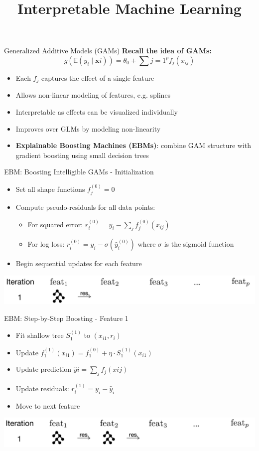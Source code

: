 \documentclass[11pt,compress,t,notes=noshow,aspectratio=169,xcolor=table]{beamer}
\title{Interpretable Machine Learning} \date{}
\begin{document}
\begin{frame}{Generalized Additive Models (GAMs)} \textbf{Recall the idea of GAMs:} \begin{equation*} g(\mathbb{E}(y_i \mid \mathbf{x}i)) = \theta_0 + \sum{j=1}^p f_j(x_{ij}) \end{equation*} \begin{itemize} \item Each $f_j$ captures the effect of a single feature \item Allows non-linear modeling of features, e.g. splines \item Interpretable as effects can be visualized individually \item Improves over GLMs by modeling non-linearity \item \textbf{Explainable Boosting Machines (EBMs)}: combine GAM structure with gradient boosting using small decision trees  \end{itemize} \end{frame}

\begin{frame}{EBM: Boosting Intelligible GAMs - Initialization} \begin{itemize} \item Set all shape functions $f_j^{(0)} = 0$ \item Compute pseudo-residuals for all data points: \begin{itemize} \item For squared error: $r_i^{(0)} = y_i - \sum_j f_j^{(0)}(x_{ij})$ \item For log loss: $r_i^{(0)} = y_i - \sigma(\hat{y}_i^{(0)})$ where $\sigma$ is the sigmoid function \end{itemize} \item Begin sequential updates for each feature \end{itemize} \includegraphics[width=1\linewidth]{figure/EBM_Step1.png} \end{frame}

\begin{frame}{EBM: Step-by-Step Boosting - Feature 1} \begin{itemize} \item Fit shallow tree $S_1^{(1)}$ to $(x_{i1}, r_i)$ \item Update $f_1^{(1)}(x_{i1}) = f_1^{(0)} + \eta \cdot S_1^{(1)}(x_{i1})$ \item Update prediction $\hat{y}i = \sum_j f_j(x{ij})$ \item Update residuals: $r_i^{(1)} = y_i - \hat{y}_i$ \item Move to next feature \end{itemize} \includegraphics[width=1\linewidth]{figure/EBM_Step2.png} \end{frame}
\end{document}
